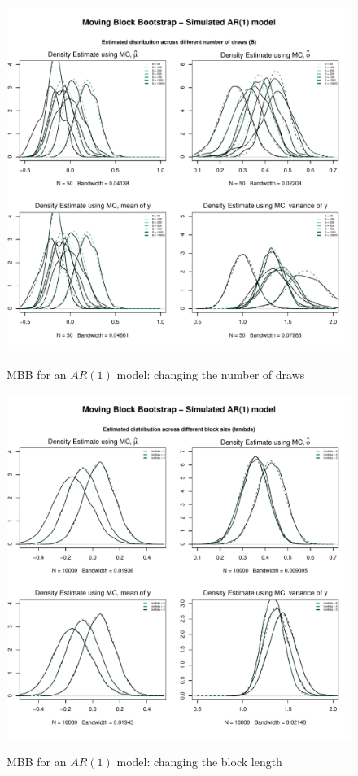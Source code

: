 \documentclass{article}
\begin{document}
\begin{figure}[hbt!]
\includegraphics[width=\textwidth]{plots/MBB_AR1_densities_diff_drawsB}
\label{fig:MBB_AR1_densities_diff_drawsB}
\caption{MBB for an $AR(1)$ model: changing the number of draws}
\centering
\end{figure}

\begin{figure}[hbt!]
\includegraphics[width=\textwidth]{plots/MBB_AR1_densities_diff_blocklength}
\label{fig:MBB_AR1_densities_diff_blocklength}
\caption{MBB for an $AR(1)$ model: changing the block length}
\centering
\end{figure}
\end{document}
